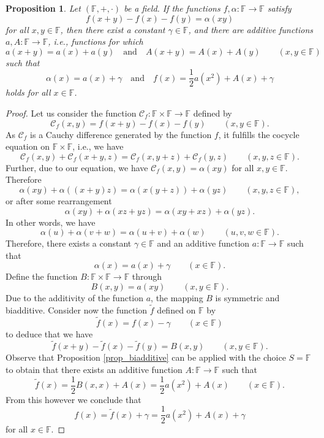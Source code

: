 \documentclass[10pt,a4paper]{amsart}
\newtheorem{prop}{Proposition}
\begin{document}
\begin{prop}\label{prop3}
 Let $(\mathbb{F}, +, \cdot)$ be a field. If the functions $f, \alpha \colon \mathbb{F}\to \mathbb{F}$ satisfy 
 \begin{equation}\label{add_product}
  f(x+y)-f(x)-f(y)= \alpha(xy)
 \end{equation}
for all $x, y\in \mathbb{F}$, then there exist a constant $\gamma\in \mathbb{F}$, and there are additive functions $a, A\colon \mathbb{F}\to \mathbb{F}$, i.e., functions for which 
\[
 a(x+y)= a(x)+a(y) 
 \quad 
 \text{and}
 \quad 
 A(x+y)= A(x)+A(y) 
 \qquad 
 \left(x, y\in \mathbb{F}\right)
\]
such that 
\[
 \alpha(x)= a(x)+\gamma 
 \quad 
 \text{and}
 \quad 
 f(x)= \frac{1}{2}a(x^{2})+A(x)+\gamma
\]
holds for all $x\in \mathbb{F}$. 
\end{prop}

\begin{proof}
 Let us consider the function $\mathscr{C}_{f}\colon \mathbb{F}\times \mathbb{F}\to \mathbb{F}$ defined by 
 \[
\mathscr{C}_{f}(x, y)= f(x+y)-f(x)-f(y)  
\qquad 
\left(x, y\in \mathbb{F}\right). 
 \]
 As $\mathscr{C}_{f}$ is a Cauchy difference generated by the function $f$, it fulfills the cocycle equation on $\mathbb{F}\times \mathbb{F}$, i.e., we have 
 \[
  \mathscr{C}_{f}(x, y)+\mathscr{C}_{f}(x+y, z)= \mathscr{C}_{f}(x, y+z)+\mathscr{C}_{f}(y, z) 
  \qquad 
  \left(x, y, z\in \mathbb{F}\right). 
 \]
 Further, due to our equation, we have $\mathscr{C}_{f}(x, y)= \alpha(xy)$ for all $x, y\in \mathbb{F}$. Therefore 
 \[
  \alpha(xy)+\alpha((x+y)z)= \alpha(x(y+z))+\alpha(yz) 
  \qquad 
  \left(x, y, z\in \mathbb{F}\right), 
 \]
or after some rearrangement 
\[
 \alpha(xy)+\alpha(xz+yz)= \alpha(xy+xz)+\alpha(yz). 
\]
In other words, we have 
\[
 \alpha(u)+\alpha(v+w)= \alpha(u+v)+\alpha(w) 
 \qquad 
 \left(u, v, w\in \mathbb{F}\right). 
\]
Therefore, there exists a constant $\gamma\in \mathbb{F}$ and an additive function $a\colon \mathbb{F}\to \mathbb{F}$ such that 
\[
 \alpha(x)= a(x)+\gamma 
 \qquad 
 \left(x\in \mathbb{F}\right). 
\]
Define the function $B\colon \mathbb{F}\times \mathbb{F}\to \mathbb{F}$ through 
\[
 B(x, y)= a (xy) 
 \qquad 
 \left(x, y\in \mathbb{F}\right). 
\]
Due to the additivity of the function $a$, the mapping $B$ is symmetric and biadditive. Consider now the function $\tilde{f}$ defined on $\mathbb{F}$ by 
\[
 \tilde{f}(x)= f(x)-\gamma 
 \qquad 
 \left(x\in \mathbb{F}\right)
\]
to deduce that we have 
\[
 \tilde{f}(x+y)-\tilde{f}(x)-\tilde{f}(y)= B(x, y) 
 \qquad 
 \left(x, y\in \mathbb{F}\right). 
\]
Observe that Proposition \ref{prop_biadditive} can be applied with the choice $S=\mathbb{F}$ to obtain that there exists an additive function $A\colon \mathbb{F}\to \mathbb{F}$ such that 
\[
 \tilde{f}(x)= \frac{1}{2}B(x, x)+A(x)=
 \frac{1}{2} a(x^{2})+A(x) 
 \qquad 
 \left(x\in \mathbb{F}\right).
\]
From this however we conclude that 
\[
 f(x)= \tilde{f}(x)+\gamma= \frac{1}{2} a(x^{2})+A(x)+\gamma
\]
for all $x\in \mathbb{F}$. 
\end{proof}
\end{document}
